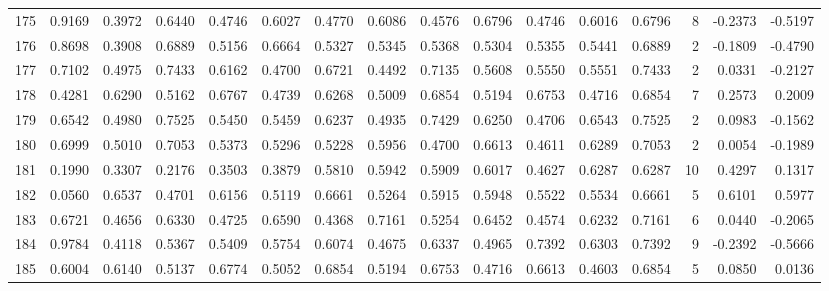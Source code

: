 \begin{tabular}{lrrrrrrrrrrrrrrr}
175 &      0.9169 &  0.3972 &  0.6440 &  0.4746 &  0.6027 &  0.4770 &  0.6086 &  0.4576 &  0.6796 &  0.4746 &   0.6016 &     0.6796 &      8 &                   -0.2373 &                    -0.5197 \\
176 &      0.8698 &  0.3908 &  0.6889 &  0.5156 &  0.6664 &  0.5327 &  0.5345 &  0.5368 &  0.5304 &  0.5355 &   0.5441 &     0.6889 &      2 &                   -0.1809 &                    -0.4790 \\
177 &      0.7102 &  0.4975 &  0.7433 &  0.6162 &  0.4700 &  0.6721 &  0.4492 &  0.7135 &  0.5608 &  0.5550 &   0.5551 &     0.7433 &      2 &                    0.0331 &                    -0.2127 \\
178 &      0.4281 &  0.6290 &  0.5162 &  0.6767 &  0.4739 &  0.6268 &  0.5009 &  0.6854 &  0.5194 &  0.6753 &   0.4716 &     0.6854 &      7 &                    0.2573 &                     0.2009 \\
179 &      0.6542 &  0.4980 &  0.7525 &  0.5450 &  0.5459 &  0.6237 &  0.4935 &  0.7429 &  0.6250 &  0.4706 &   0.6543 &     0.7525 &      2 &                    0.0983 &                    -0.1562 \\
180 &      0.6999 &  0.5010 &  0.7053 &  0.5373 &  0.5296 &  0.5228 &  0.5956 &  0.4700 &  0.6613 &  0.4611 &   0.6289 &     0.7053 &      2 &                    0.0054 &                    -0.1989 \\
181 &      0.1990 &  0.3307 &  0.2176 &  0.3503 &  0.3879 &  0.5810 &  0.5942 &  0.5909 &  0.6017 &  0.4627 &   0.6287 &     0.6287 &     10 &                    0.4297 &                     0.1317 \\
182 &      0.0560 &  0.6537 &  0.4701 &  0.6156 &  0.5119 &  0.6661 &  0.5264 &  0.5915 &  0.5948 &  0.5522 &   0.5534 &     0.6661 &      5 &                    0.6101 &                     0.5977 \\
183 &      0.6721 &  0.4656 &  0.6330 &  0.4725 &  0.6590 &  0.4368 &  0.7161 &  0.5254 &  0.6452 &  0.4574 &   0.6232 &     0.7161 &      6 &                    0.0440 &                    -0.2065 \\
184 &      0.9784 &  0.4118 &  0.5367 &  0.5409 &  0.5754 &  0.6074 &  0.4675 &  0.6337 &  0.4965 &  0.7392 &   0.6303 &     0.7392 &      9 &                   -0.2392 &                    -0.5666 \\
185 &      0.6004 &  0.6140 &  0.5137 &  0.6774 &  0.5052 &  0.6854 &  0.5194 &  0.6753 &  0.4716 &  0.6613 &   0.4603 &     0.6854 &      5 &                    0.0850 &                     0.0136 \\

\end{tabular}

